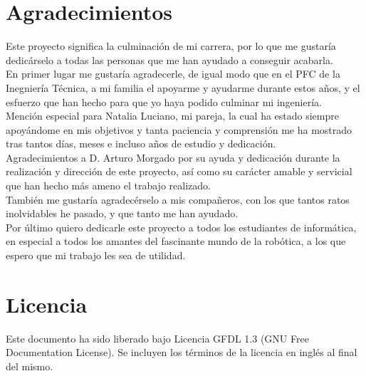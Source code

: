 

\section*{Agradecimientos}

Este proyecto significa la culminación de mi carrera, por lo que me gustaría dedicárselo a todas las personas que me han ayudado a conseguir acabarla.\\

En primer lugar me gustaría agradecerle, de igual modo que en el PFC de la Inegniería Técnica, a mi familia el apoyarme y ayudarme durante estos años, y el esfuerzo que han hecho para que yo haya podido culminar mi ingeniería.\\

Mención especial para Natalia Luciano, mi pareja, la cual ha estado siempre apoyándome en mis objetivos y tanta paciencia y comprensión me ha mostrado tras tantos días, meses e incluso años de estudio y dedicación.\\ 

Agradecimientos a D. Arturo Morgado por su ayuda y dedicación durante la realización y dirección de este proyecto, así como su carácter amable y servicial que han hecho más ameno el trabajo realizado.\\

También me gustaría agradecérselo a mis compañeros, con los que tantos ratos inolvidables he pasado, y que tanto me han ayudado.\\

Por último quiero dedicarle este proyecto a todos los estudiantes de informática, en especial a todos los amantes del fascinante mundo de la robótica, a los que espero que mi trabajo les sea de utilidad.\\

\cleardoublepage

\section*{Licencia}

\bigskip
\bigskip

Este documento ha sido liberado bajo Licencia GFDL 1.3 (GNU Free Documentation License). Se incluyen los términos de la licencia en inglés al final del mismo.\\

